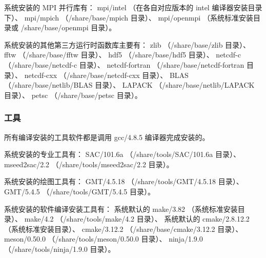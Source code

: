 \documentclass[UTF8]{ctexart}
\begin{document}
系统安装的 MPI 并行库有：\newline
mpi/intel （在各自对应版本的 intel 编译器安装目录下）、\newline
mpi/mpich （/share/base/mpich 目录）、\newline
mpi/openmpi （系统标准安装目录或 /share/base/openmpi 目录）。
\bigskip

系统安装的其他第三方运行时函数库主要有：\newline
zlib （/share/base/zlib 目录）、\newline
fftw （/share/base/fftw 目录）、\newline
hdf5 （/share/base/hdf5 目录）、\newline
netcdf-c （/share/base/netcdf-c 目录）、\newline
netcdf-fortran （/share/base/netcdf-fortran 目录）、\newline
netcdf-cxx （/share/base/netcdf-cxx 目录）、\newline
BLAS （/share/base/netlib/BLAS 目录）、\newline
LAPACK （/share/base/netlib/LAPACK 目录）、\newline
petsc （/share/base/petsc 目录）。

\subsubsection{工具}
所有编译安装的工具软件都是调用 gcc/4.8.5 编译器完成安装的。
\bigskip

系统安装的专业工具有：\newline
SAC/101.6a （/share/tools/SAC/101.6a 目录）、\newline
mseed2sac/2.2 （/share/tools/mseed2sac/2.2 目录）。
\bigskip

系统安装的绘图工具有：\newline
GMT/4.5.18 （/share/tools/GMT/4.5.18 目录）、\newline
GMT/5.4.5 （/share/tools/GMT/5.4.5 目录）。
\bigskip

系统安装的软件编译安装工具有：\newline
系统默认的 make/3.82 （系统标准安装目录）、\newline
make/4.2 （/share/tools/make/4.2 目录）、\newline
系统默认的 cmake/2.8.12.2 （系统标准安装目录）、\newline
cmake/3.12.2 （/share/base/cmake/3.12.2 目录）、\newline
meson/0.50.0 （/share/tools/meson/0.50.0 目录）、\newline
ninja/1.9.0 （/share/tools/ninja/1.9.0 目录）。
\bigskip
\end{document}
